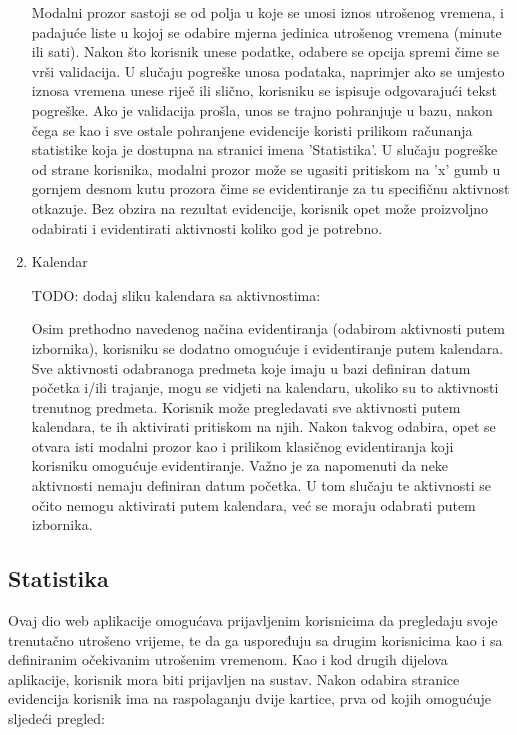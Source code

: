 \documentclass[times, utf8, zavrsni, numeric]{fer}
\begin{document}
\begin{enumerate}
Modalni prozor sastoji se od polja u koje se unosi iznos utrošenog vremena, i padajuće liste u kojoj se odabire mjerna jedinica utrošenog vremena (minute ili sati). Nakon što korisnik unese podatke, odabere se opcija spremi čime se vrši validacija. U slučaju pogreške unosa podataka, naprimjer ako se umjesto iznosa vremena unese riječ ili slično, korisniku se ispisuje odgovarajući tekst pogreške. Ako je validacija prošla, unos se trajno pohranjuje u bazu, nakon čega se kao i sve ostale pohranjene evidencije koristi prilikom računanja statistike koja je dostupna na stranici imena 'Statistika'. U slučaju pogreške od strane korisnika, modalni prozor može se ugasiti pritiskom na 'x' gumb u gornjem desnom kutu prozora čime se evidentiranje za tu specifičnu aktivnost otkazuje. Bez obzira na rezultat evidencije, korisnik opet može proizvoljno odabirati i evidentirati aktivnosti koliko god je potrebno.

\item Kalendar

TODO: dodaj sliku kalendara sa aktivnostima:

Osim prethodno navedenog načina evidentiranja (odabirom aktivnosti putem izbornika), korisniku se dodatno omogućuje i evidentiranje putem kalendara. Sve aktivnosti odabranoga predmeta koje imaju u bazi definiran datum početka i/ili trajanje, mogu se vidjeti na kalendaru, ukoliko su to aktivnosti trenutnog predmeta. Korisnik može pregledavati sve aktivnosti putem kalendara, te ih aktivirati pritiskom na njih. Nakon takvog odabira, opet se otvara isti modalni prozor kao i prilikom klasičnog evidentiranja koji korisniku omogućuje evidentiranje. Važno je za napomenuti da neke aktivnosti nemaju definiran datum početka. U tom slučaju te aktivnosti se očito nemogu aktivirati putem kalendara, već se moraju odabrati putem izbornika.
\end{enumerate}


\subsection{Statistika}
Ovaj dio web aplikacije omogućava prijavljenim korisnicima da pregledaju svoje trenutačno utrošeno vrijeme, te da ga uspoređuju sa drugim korisnicima kao i sa definiranim očekivanim utrošenim vremenom. Kao i kod drugih dijelova aplikacije, korisnik mora biti prijavljen na sustav. Nakon odabira stranice evidencija korisnik ima na raspolaganju dvije kartice, prva od kojih omogućuje sljedeći pregled:
\end{document}
